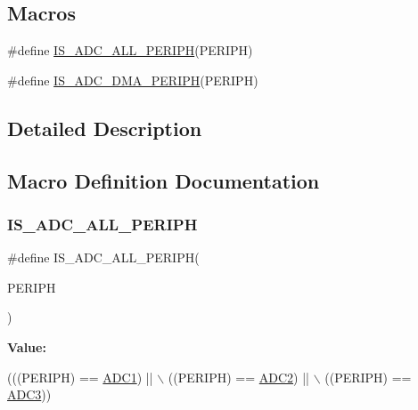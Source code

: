 \subsection*{Macros}
\begin{DoxyCompactItemize}
\item 
\#define \hyperlink{group___a_d_c___exported___constants_gaf5d6bd0153464912e0eaccb1af1aefb2}{I\+S\+\_\+\+A\+D\+C\+\_\+\+A\+L\+L\+\_\+\+P\+E\+R\+I\+PH}(P\+E\+R\+I\+PH)
\item 
\#define \hyperlink{group___a_d_c___exported___constants_ga56ce1703cee9a93969fc507b985ee949}{I\+S\+\_\+\+A\+D\+C\+\_\+\+D\+M\+A\+\_\+\+P\+E\+R\+I\+PH}(P\+E\+R\+I\+PH)
\end{DoxyCompactItemize}


\subsection{Detailed Description}


\subsection{Macro Definition Documentation}
\mbox{\label{group___a_d_c___exported___constants_gaf5d6bd0153464912e0eaccb1af1aefb2}} 
\subsubsection{\texorpdfstring{I\+S\+\_\+\+A\+D\+C\+\_\+\+A\+L\+L\+\_\+\+P\+E\+R\+I\+PH}{IS\_ADC\_ALL\_PERIPH}}
{\footnotesize\ttfamily \#define I\+S\+\_\+\+A\+D\+C\+\_\+\+A\+L\+L\+\_\+\+P\+E\+R\+I\+PH(\begin{DoxyParamCaption}\item[{}]{P\+E\+R\+I\+PH }\end{DoxyParamCaption})}

{\bfseries Value\+:}
\begin{DoxyCode}
(((PERIPH) == \hyperlink{group___peripheral__declaration_ga90d2d5c526ce5c0a551f533eccbee71a}{ADC1}) || \(\backslash\)
                                   ((PERIPH) == \hyperlink{group___peripheral__declaration_gac5503ae96c26b4475226f96715a1bf1e}{ADC2}) || \(\backslash\)
                                   ((PERIPH) == \hyperlink{group___peripheral__declaration_gae917784606daf6b04c9b7b96b40c2f74}{ADC3}))
\end{DoxyCode}


